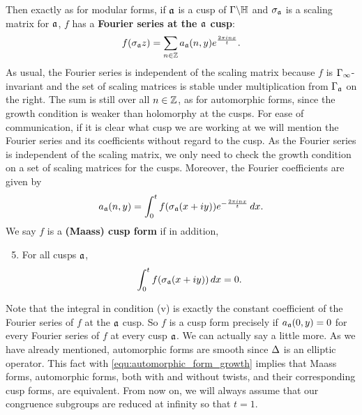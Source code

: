       Then exactly as for modular forms, if $\mathfrak{a}$ is a cusp of $\Gamma\backslash\mathbb{H}$ and $\sigma_{\mathfrak{a}}$ is a scaling matrix for $\mathfrak{a}$, $f$ has a \textbf{Fourier series at the $\mathfrak{a}$ cusp}:
      \[
        f(\sigma_{\mathfrak{a}}z) = \sum_{n \in \mathbb{Z}}a_{\mathfrak{a}}(n,y)e^{\frac{2\pi inx}{t}}.
      \]
      As usual, the Fourier series is independent of the scaling matrix because $f$ is $\Gamma_{\infty}$-invariant and the set of scaling matrices is stable under multiplication from $\Gamma_{\mathfrak{a}}$ on the right. The sum is still over all $n \in \mathbb{Z}$, as for automorphic forms, since the growth condition is weaker than holomorphy at the cusps. For ease of communication, if it is clear what cusp we are working at we will mention the Fourier series and its coefficients without regard to the cusp. As the Fourier series is independent of the scaling matrix, we only need to check the growth condition on a set of scaling matrices for the cusps. Moreover, the Fourier coefficients are given by
      \[
        a_{\mathfrak{a}}(n,y) = \int_{0}^{t}f(\sigma_{\mathfrak{a}}(x+iy))e^{-\frac{2\pi inx}{t}}\,dx.
      \]
      We say $f$ is a \textbf{(Maass) cusp form} if in addition,
      \begin{enumerate}[label=(\roman*)]
        \setcounter{enumi}{4}
        \item For all cusps $\mathfrak{a}$,
        \[
          \int_{0}^{t}f(\sigma_{\mathfrak{a}}(x+iy))\,dx = 0.
        \]
      \end{enumerate}
      Note that the integral in condition (v) is exactly the constant coefficient of the Fourier series of $f$ at the $\mathfrak{a}$ cusp. So $f$ is a cusp form precisely if $a_{\mathfrak{a}}(0,y) = 0$ for every Fourier series of $f$ at every cusp $\mathfrak{a}$. We can actually say a little more. As we have already mentioned, automorphic forms are smooth since $\Delta$ is an elliptic operator. This fact with \cref{equ:automorphic_form_growth} implies that Maass forms, automorphic forms, both with and without twists, and their corresponding cusp forms, are equivalent. From now on, we will always assume that our congruence subgroups are reduced at infinity so that $t = 1$.
